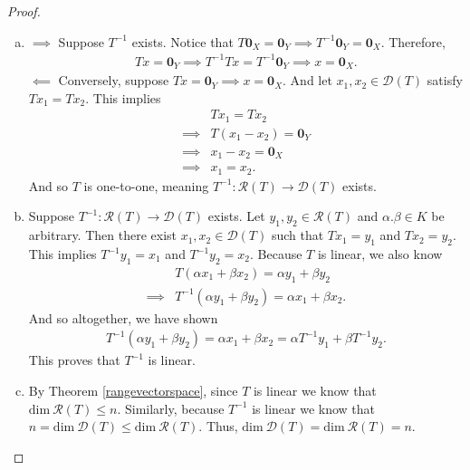 \documentclass[11pt]{article}
\theoremstyle{mystyle}
\newcommand{\0}{\mathbf{0}}
\begin{document}
\begin{proof}
\begin{enumerate}[(a)]
    \item $\implies$ Suppose $T^{-1}$ exists. Notice that $T\0_X = \0_Y \implies T^{-1}\0_Y = \0_X$. Therefore,
    \begin{align*}
        Tx = \0_Y \implies T^{-1}Tx = T^{-1}\0_Y \implies x = \0_X.
    \end{align*}
    $\impliedby$ Conversely, suppose $Tx = \0_Y \implies x = \0_X$. And let $x_1, x_2 \in \mathscr{D}(T)$ satisfy $Tx_1 = Tx_2$. This implies
    \begin{align*}
    &Tx_1 = Tx_2\\
    \implies& T(x_1 - x_2) = \0_Y\\
    \implies& x_1 - x_2 = \0_X\\
    \implies& x_1 = x_2.
    \end{align*}
    And so $T$ is one-to-one, meaning $T^{-1}: \mathscr{R}(T) \longrightarrow \mathscr{D}(T)$ exists.
    
    \item Suppose $T^{-1}: \mathscr{R}(T) \longrightarrow \mathscr{D}(T)$ exists. Let $y_1, y_2 \in \mathscr{R}(T)$ and $\alpha. \beta \in K$ be arbitrary. Then there exist $x_1, x_2 \in \mathscr{D}(T)$ such that $Tx_1 = y_1$ and $Tx_2 = y_2$. This implies $T^{-1}y_1 = x_1$ and $T^{-1}y_2 = x_2$. Because $T$ is linear, we also know
    \begin{align*}
        &T(\alpha x_1 + \beta x_2) = \alpha y_1+ \beta y_2\\
        \implies& T^{-1}(\alpha y_1+ \beta y_2) = \alpha x_1 + \beta x_2.
    \end{align*}
    And so altogether, we have shown 
    \begin{align*}
        T^{-1}(\alpha y_1+ \beta y_2) = \alpha x_1 + \beta x_2 = \alpha T^{-1} y_1 + \beta T^{-1} y_2.
    \end{align*}
    This proves that $T^{-1}$ is linear.
    
    \item By Theorem \ref{rangevectorspace}, since $T$ is linear we know that $\text{dim} \ \mathscr{R}(T) \leq n$. Similarly, because $T^{-1}$ is linear we know that $n = \text{dim} \ \mathscr{D}(T) \leq \text{dim} \ \mathscr{R}(T)$. Thus, $\text{dim} \ \mathscr{D}(T) = \text{dim} \ \mathscr{R}(T) = n$.
\end{enumerate}
\end{proof}
\end{document}
